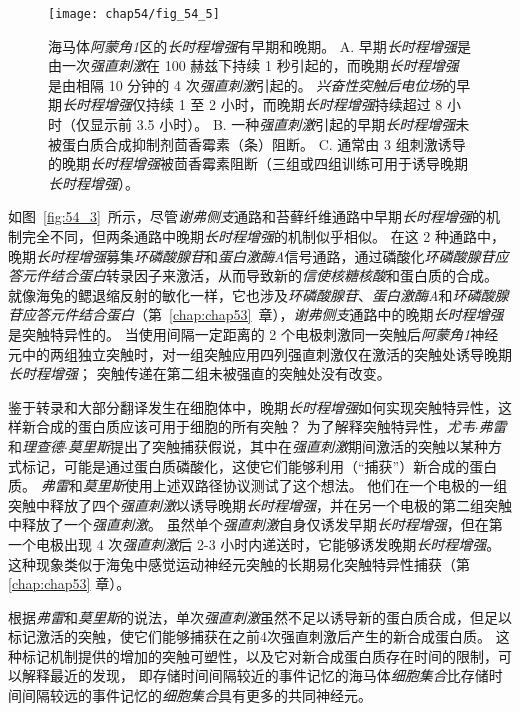 \begin{figure}[htbp]
	\centering
	\texttt{[image: chap54/fig\_54\_5]}
	\caption{海马体\textit{阿蒙角1}区的\textit{长时程增强}有早期和晚期。
		A. 早期\textit{长时程增强}是由一次\textit{强直刺激}在 100 赫兹下持续 1 秒引起的，而晚期\textit{长时程增强}是由相隔 10 分钟的 4 次\textit{强直刺激}引起的。
		\textit{兴奋性突触后电位场}的早期\textit{长时程增强}仅持续 1 至 2 小时，而晚期\textit{长时程增强}持续超过 8 小时（仅显示前 3.5 小时）。
		B. 一种\textit{强直刺激}引起的早期\textit{长时程增强}未被蛋白质合成抑制剂茴香霉素（条）阻断。
		C. 通常由 3 组刺激诱导的晚期\textit{长时程增强}被茴香霉素阻断（三组或四组训练可用于诱导晚期\textit{长时程增强}）\cite{huang1994recruitment}。}
	\label{fig:54_5}
\end{figure}


如图~\ref{fig:54_3}~所示，尽管\textit{谢弗侧支}通路和苔藓纤维通路中早期\textit{长时程增强}的机制完全不同，但两条通路中晚期\textit{长时程增强}的机制似乎相似。
在这 2 种通路中，晚期\textit{长时程增强}募集\textit{环磷酸腺苷}和\textit{蛋白激酶A}信号通路，通过磷酸化\textit{环磷酸腺苷应答元件结合蛋白}转录因子来激活，从而导致新的\textit{信使核糖核酸}和蛋白质的合成。
就像海兔的鳃退缩反射的敏化一样，它也涉及\textit{环磷酸腺苷}、\textit{蛋白激酶A}和\textit{环磷酸腺苷应答元件结合蛋白}（第~\ref{chap:chap53}~章），\textit{谢弗侧支}通路中的晚期\textit{长时程增强}是突触特异性的。
当使用间隔一定距离的 2 个电极刺激同一突触后\textit{阿蒙角1}神经元中的两组独立突触时，对一组突触应用四列强直刺激仅在激活的突触处诱导晚期\textit{长时程增强}；
突触传递在第二组未被强直的突触处没有改变。


鉴于转录和大部分翻译发生在细胞体中，晚期\textit{长时程增强}如何实现突触特异性，这样新合成的蛋白质应该可用于细胞的所有突触？
为了解释突触特异性，\textit{尤韦$\cdot$弗雷}和\textit{理查德$\cdot$莫里斯}提出了突触捕获假说，其中在\textit{强直刺激}期间激活的突触以某种方式标记，可能是通过蛋白质磷酸化，这使它们能够利用（“捕获”）新合成的蛋白质。
\textit{弗雷}和\textit{莫里斯}使用上述双路径协议测试了这个想法。
他们在一个电极的一组突触中释放了四个\textit{强直刺激}以诱导晚期\textit{长时程增强}，并在另一个电极的第二组突触中释放了一个\textit{强直刺激}。
虽然单个\textit{强直刺激}自身仅诱发早期\textit{长时程增强}，但在第一个电极出现 4 次\textit{强直刺激}后 2-3 小时内递送时，它能够诱发晚期\textit{长时程增强}。
这种现象类似于海兔中感觉运动神经元突触的长期易化突触特异性捕获（第 \ref{chap:chap53} 章）。


根据\textit{弗雷}和\textit{莫里斯}的说法，单次\textit{强直刺激}虽然不足以诱导新的蛋白质合成，但足以标记激活的突触，使它们能够捕获在之前4次强直刺激后产生的新合成蛋白质。
这种标记机制提供的增加的突触可塑性，以及它对新合成蛋白质存在时间的限制，可以解释最近的发现，
即存储时间间隔较近的事件记忆的海马体\textit{细胞集合}比存储时间间隔较远的事件记忆的\textit{细胞集合}具有更多的共同神经元。


